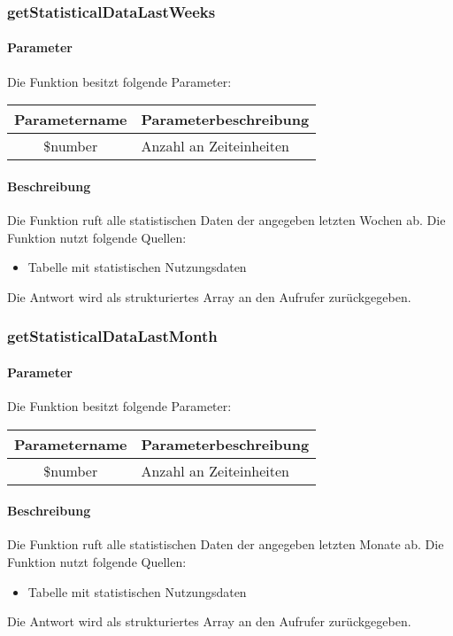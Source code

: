 \subsubsection{getStatisticalDataLastWeeks}
\paragraph{Parameter} Die Funktion besitzt folgende Parameter:
\begin{table}[H]
	\begin{tabular}{|c|p{11cm}|}
		\hline
		\textbf{Parametername} & \textbf{Parameterbeschreibung} \\ \hline
		\$number & Anzahl an Zeiteinheiten \\ \hline
	\end{tabular}
\end{table}
\paragraph{Beschreibung} Die Funktion ruft alle statistischen Daten der angegeben letzten Wochen ab. Die Funktion nutzt folgende Quellen:
\begin{itemize}
	\item Tabelle mit statistischen Nutzungsdaten
\end{itemize}
Die Antwort wird als strukturiertes Array an den Aufrufer zurückgegeben.
\subsubsection{getStatisticalDataLastMonth}
\paragraph{Parameter} Die Funktion besitzt folgende Parameter:
\begin{table}[H]
	\begin{tabular}{|c|p{11cm}|}
		\hline
		\textbf{Parametername} & \textbf{Parameterbeschreibung} \\ \hline
		\$number & Anzahl an Zeiteinheiten \\ \hline
	\end{tabular}
\end{table}
\paragraph{Beschreibung} Die Funktion ruft alle statistischen Daten der angegeben letzten Monate ab. Die Funktion nutzt folgende Quellen:
\begin{itemize}
	\item Tabelle mit statistischen Nutzungsdaten
\end{itemize}
Die Antwort wird als strukturiertes Array an den Aufrufer zurückgegeben.
